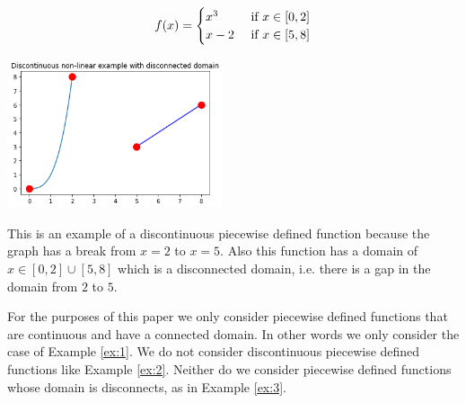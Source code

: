 \documentclass[10pt]{article}
\begin{document}
\begin{example}
\label{ex:3}
$$
f(x) =
\begin{cases}
x^3 & \hbox{ if } x\in [0,2] \\
x-2 & \hbox{ if } x \in [5, 8]
\end{cases}
$$
\begin{center}
\includegraphics[width=2.5in]{graph3}
\end{center}
This is an example of a discontinuous piecewise defined function because the
graph has a break from $x=2$ to $x=5$.  Also this function has a domain of
$x \in [0, 2] \cup [5,8]$ which is a disconnected domain, i.e.
there is a gap in the domain from $2$ to $5$.
\end{example}

\begin{note}[Warning!]
For the purposes of this paper we only consider piecewise defined functions
that are continuous and have a connected domain.  In other words we only
consider the case of Example \ref{ex:1}.  We do not consider discontinuous
piecewise defined functions like Example \ref{ex:2}.  Neither do we consider
piecewise defined functions whose domain is disconnects, as in Example
\ref{ex:3}.
\end{note}
\end{document}
